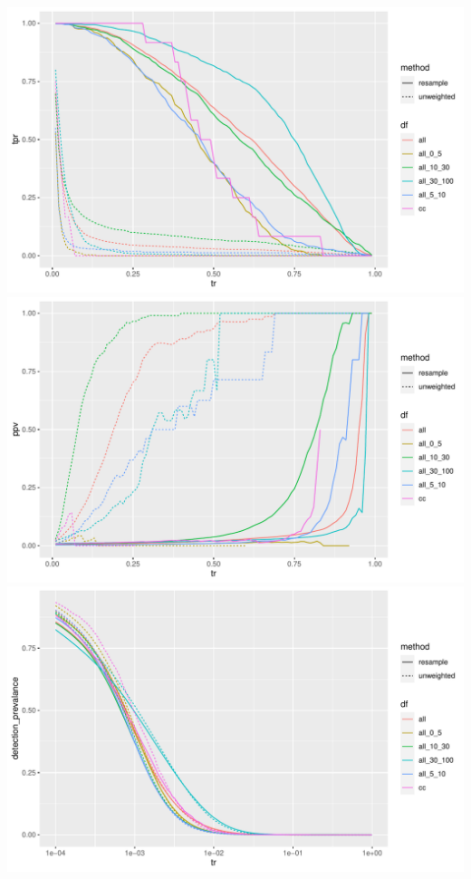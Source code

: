 \documentclass[12pt]{article}
\begin{document}
\newpage
\begin{center}
\includegraphics[width=.7\textwidth]{tpr_missing.pdf}
\includegraphics[width=.7\textwidth]{ppv_missing.pdf}
\includegraphics[width=.7\textwidth]{dp_missing.pdf}
\end{center}
\pagebreak
\end{document}
